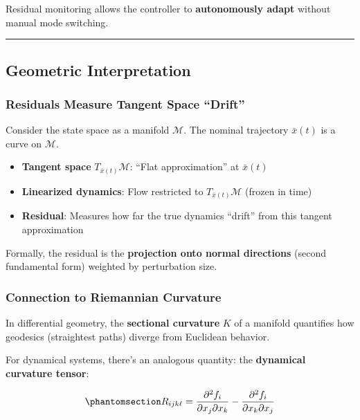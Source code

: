 \documentclass[
  letterpaper,
  DIV=11,
  numbers=noendperiod]{scrartcl}
\providecommand{\tightlist}{%
  \setlength{\itemsep}{0pt}\setlength{\parskip}{0pt}}\usepackage{longtable,booktabs,array}
\begin{document}
Residual monitoring allows the controller to \textbf{autonomously adapt}
without manual mode switching.

\begin{center}\rule{0.5\linewidth}{0.5pt}\end{center}

\subsection{Geometric Interpretation}\label{sec-geometry}

\subsubsection{Residuals Measure Tangent Space
``Drift''}\label{residuals-measure-tangent-space-drift}

Consider the state space as a manifold \(\mathcal{M}\). The nominal
trajectory \(\bar{x}(t)\) is a curve on \(\mathcal{M}\).

\begin{itemize}
\tightlist
\item
  \textbf{Tangent space} \(T_{\bar{x}(t)} \mathcal{M}\): ``Flat
  approximation'' at \(\bar{x}(t)\)
\item
  \textbf{Linearized dynamics}: Flow restricted to
  \(T_{\bar{x}(t)} \mathcal{M}\) (frozen in time)
\item
  \textbf{Residual}: Measures how far the true dynamics ``drift'' from
  this tangent approximation
\end{itemize}

Formally, the residual is the \textbf{projection onto normal directions}
(second fundamental form) weighted by perturbation size.

\subsubsection{Connection to Riemannian
Curvature}\label{connection-to-riemannian-curvature}

In differential geometry, the \textbf{sectional curvature} \(K\) of a
manifold quantifies how geodesics (straightest paths) diverge from
Euclidean behavior.

For dynamical systems, there's an analogous quantity: the
\textbf{dynamical curvature tensor}:

\begin{equation}\phantomsection\label{eq-curvature-tensor}{
R_{ijk\ell} = \frac{\partial^2 f_i}{\partial x_j \partial x_k} - \frac{\partial^2 f_i}{\partial x_k \partial x_j}
}\end{equation}
\end{document}

